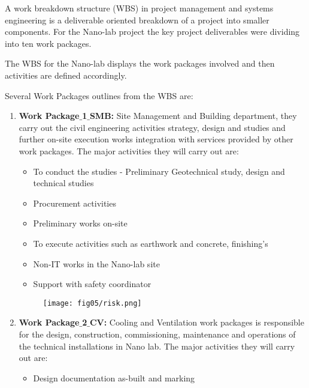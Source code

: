 A work breakdown structure (WBS) in project management and systems engineering is a deliverable oriented breakdown of a project into smaller components. For the Nano-lab project the key project deliverables were dividing into ten work packages.  

The WBS for the Nano-lab displays the work packages involved and then activities are defined accordingly.

Several Work Packages outlines from the WBS are:

\begin{enumerate}
	\item \textbf{Work Package$\_$1$\_$SMB:} Site Management and Building department, they carry out the civil engineering activities strategy, design and studies and further on-site execution works integration with services provided by other work packages. The major activities they will carry out are: 
	\begin{itemize}
		\item 	To conduct the studies - Preliminary Geotechnical study,  design and technical studies 
		
		\item Procurement activities 
		  
		\item Preliminary works on-site
		
		\item To execute activities such as earthwork and concrete, finishing’s
		
		\item Non-IT works in the Nano-lab site 
		
		\item Support with safety  coordinator
	\end{itemize}
	
	\begin{figure}
		\centering
		\texttt{[image: fig05/risk.png]}
	\end{figure}

	\item \textbf{Work Package$\_$2$\_$CV:} Cooling and Ventilation work packages is responsible for the design, construction, commissioning, maintenance and operations of the technical installations in Nano lab.
	The major activities they will carry out are: 
	\begin{itemize}
		\item Design documentation as-built and marking
		

\end{itemize}
\end{enumerate}
